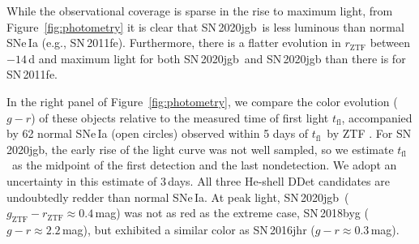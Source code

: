 \documentclass[twocolumn]{aastex631}
\newcommand{\sn}{SN\,2020jgb}
\newcommand{\tfl}{$t_\mathrm{fl}$}
\begin{document}
While the observational coverage is sparse in the rise to maximum light, from Figure~\ref{fig:photometry} it is clear that \sn\ is less luminous than normal SNe\,Ia (e.g., SN\,2011fe). Furthermore, there is a flatter evolution in $r_\mathrm{ZTF}$ between $-14$\,d and maximum light for both \sn\ and SN\,2020jgb than there is for SN\,2011fe.  

In the right panel of Figure~\ref{fig:photometry}, we compare the color evolution ($g-r$) of these objects relative to the measured time of first light \tfl, accompanied by 62 normal SNe\,Ia (open circles) observed within 5 days of \tfl\ by ZTF \citep[from][]{Bulla2020}. For \sn, the early rise of the light curve was not well sampled, so we estimate \tfl\ as the midpoint of the first detection and the last nondetection. We adopt an uncertainty in this estimate of 3\,days. All three He-shell DDet candidates are undoubtedly redder than normal SNe\,Ia. At peak light, \sn\ ($g_\mathrm{ZTF}-r_\mathrm{ZTF}\approx0.4$\,mag) was not as red as the extreme case, SN\,2018byg ($g-r\approx2.2$\,mag), but exhibited a similar color as SN\,2016jhr ($g-r\approx0.3$\,mag).
\end{document}
